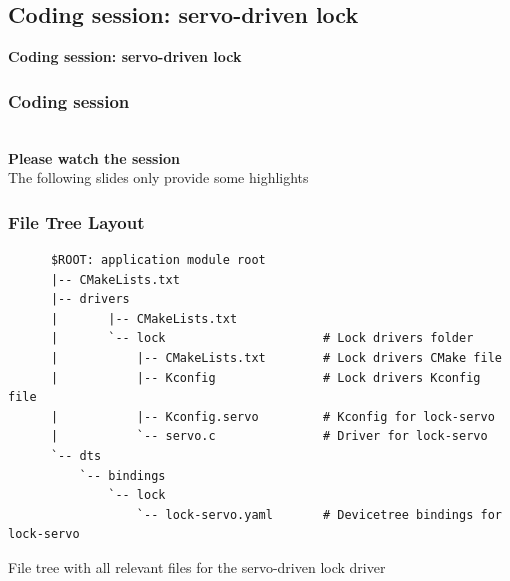 \documentclass[handout]{beamer}
\begin{document}
\subsection{Coding session: servo-driven lock}

\begin{frame}
  \begin{center}
    \Large \textbf{Coding session: servo-driven lock}
  \end{center}
\end{frame}

\begin{frame}
  \frametitle{Coding session}

  \begin{center}
    \Huge \faInfoCircle\\
    \vspace{1ex}
    \Large \textbf{Please watch the session}\\
    \large The following slides only provide some highlights
  \end{center}
\end{frame}

\begin{frame}[fragile]
  \frametitle{File Tree Layout}

  \begin{listing}[H]
    \begin{verbatim}
      $ROOT: application module root
      |-- CMakeLists.txt
      |-- drivers
      |       |-- CMakeLists.txt
      |       `-- lock                      # Lock drivers folder
      |           |-- CMakeLists.txt        # Lock drivers CMake file
      |           |-- Kconfig               # Lock drivers Kconfig file
      |           |-- Kconfig.servo         # Kconfig for lock-servo
      |           `-- servo.c               # Driver for lock-servo
      `-- dts
          `-- bindings
              `-- lock
                  `-- lock-servo.yaml       # Devicetree bindings for lock-servo
    \end{verbatim}
    \caption{File tree with all relevant files for the servo-driven lock driver}
  \end{listing}
\end{frame}
\end{document}
